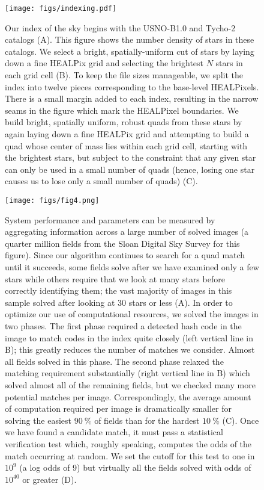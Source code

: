 \documentclass[12pt,preprint]{aastex}
\renewcommand{\%}{\percent}
\begin{document}
\begin{figure}
\begin{center}
\texttt{[image: figs/indexing.pdf]}
\caption{Our index of the sky begins with the USNO-B1.0 and Tycho-2
  catalogs (A).  This figure shows the number density of stars in
  these catalogs.  We select a bright, spatially-uniform cut of stars
  by laying down a fine HEALPix grid and selecting the brightest $N$
  stars in each grid cell (B).  To keep the file sizes manageable, we
  split the index into twelve pieces corresponding to the base-level
  HEALPixels.  There is a small margin added to each index, resulting
  in the narrow seams in the figure which mark the HEALPixel
  boundaries.  We build bright, spatially uniform, robust quads from
  these stars by again laying down a fine HEALPix grid and attempting
  to build a quad whose center of mass lies within each grid cell,
  starting with the brightest stars, but subject to the constraint
  that any given star can only be used in a small number of quads
  (hence, losing one star causes us to lose only a small number of
  quads) (C). \label{fig:indexing}}
\end{center}
\end{figure}
\vspace*{-.5in}

\begin{figure}
\begin{center}
\texttt{[image: figs/fig4.png]} 
\caption{System performance and parameters can be measured by
 aggregating information across a large number of solved images (a
 quarter million fields from the Sloan Digital Sky Survey for this
 figure).  Since our algorithm continues to search for a quad match
 until it succeeds, some fields solve after we have examined only a
 few stars while others require that we look at many stars before
 correctly identifying them; the vast majority of images in this
 sample solved after looking at 30 stars or less (A). In order to
 optimize our use of computational resources, we solved the images in
 two phases. The first phase required a detected hash code in the
 image to match codes in the index quite closely (left vertical line
 in B); this greatly reduces the number of matches we consider. Almost
 all fields solved in this phase.  The second phase relaxed the
 matching requirement substantially (right vertical line in B) which
 solved almost all of the remaining fields, but we checked many more
 potential matches per image.  Correspondingly, the average amount of
 computation required per image is dramatically smaller for solving
 the easiest $90~\%$ of fields than for the hardest $10~\%$ (C).  Once
 we have found a candidate match, it must pass a statistical
 verification test which, roughly speaking, computes the odds of the
 match occurring at random. We set the cutoff for this test to one in
 $10^9$ (a log odds of 9) but virtually all the fields solved with
 odds of $10^{40}$ or greater (D).  \label{fig:stats}}
\end{center}
\end{figure} 
\end{document}

